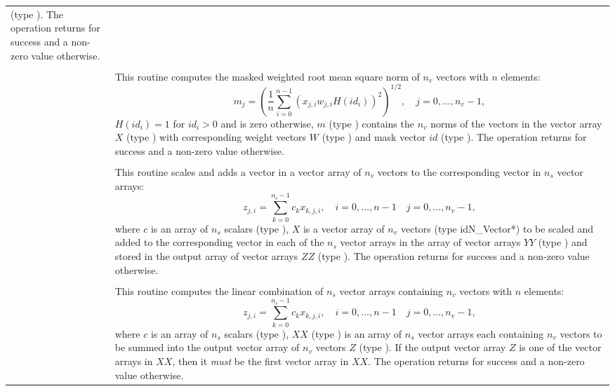 \begin{xtabular}{|p{\colonec}|p{\coltwoc}|}
(type ). The operation returns  for success and a non-zero
value otherwise.
\\[2mm]
 &  \\
& This routine computes the masked weighted root mean square norm of $n_v$
vectors with $n$ elements:
\begin{equation*}
m_j = \left( \frac1n \sum_{i=0}^{n-1} \left(x_{j,i} w_{j,i}
H(id_i)\right)^2 \right)^{1/2}, \quad j=0,\ldots,n_v-1,
\end{equation*}
$H(id_i)=1$ for $id_i > 0$ and is zero otherwise, $m$ (type ) contains
the $n_v$ norms of the vectors in the vector array $X$ (type ) with
corresponding weight vectors $W$ (type ) and mask vector $id$
(type ). The operation returns  for success and a non-zero
value otherwise.
\\[2mm]
 &  \\ 
& This routine scales and adds a vector in a vector array of $n_v$ vectors to
the corresponding vector in $n_s$ vector arrays:
\begin{equation*}
z_{j,i} = \sum_{k=0}^{n_s-1} c_k x_{k,j,i}, \quad i=0,\ldots,n-1 \quad j=0,\ldots,n_v-1,
\end{equation*}
where $c$ is an array of $n_s$ scalars (type ), $X$ is a vector
array of $n_v$ vectors (type id{N\_Vector*}) to be scaled and added to the
corresponding vector in each of the $n_s$ vector arrays in the array of vector
arrays $YY$ (type ) and stored in the output array of vector
arrays $ZZ$ (type ). The operation returns  for success
and a non-zero value otherwise.
\\[2mm]
 &  \\ 
& This routine computes the linear combination of $n_s$ vector arrays containing
$n_v$ vectors with $n$ elements:
\begin{equation*}
z_{j,i} = \sum_{k=0}^{n_s-1} c_k x_{k,j,i}, \quad i=0,\ldots,n-1 \quad j=0,\ldots,n_v-1,
\end{equation*}
where $c$ is an array of $n_s$ scalars (type ), $XX$
(type ) is an array of $n_s$ vector arrays each containing $n_v$
vectors to be summed into the output vector array of $n_v$ vectors $Z$ (type
). If the output vector array $Z$ is one of the vector arrays in
$XX$, then it \textit{must} be the first vector array in $XX$. The operation
returns  for success and a non-zero value otherwise.
\\
\end{xtabular}

